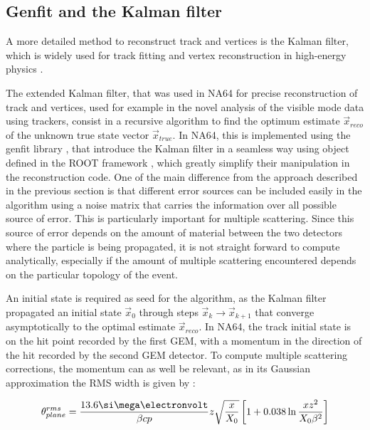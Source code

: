 \subsection{Genfit and the Kalman filter}
\label{appD:sec:kalman-filter}

A more detailed method to reconstruct track and vertices is the Kalman filter, which is widely used for track fitting and vertex reconstruction in high-energy physics \cite{HOPPNER2010518}.

The extended Kalman filter, that was used in NA64 for precise reconstruction of track and vertices, used for example in the novel analysis of the visible mode data using trackers, consist in a recursive algorithm to find the optimum estimate $\vec{x}_{reco}$ of the unknown true state vector $\vec{x}_{true}$. In NA64, this is implemented using the genfit library \cite{genfit}, that introduce the Kalman filter in a seamless way using object defined in the ROOT framework \cite{root}, which greatly simplify their manipulation in the reconstruction code. One of the main difference from the approach described in the previous section is that different error sources can be included easily in the algorithm using a noise matrix that carries the information over all possible source of error. This is particularly important for multiple scattering. Since this source of error depends on the amount of material between the two detectors where the particle is being propagated, it is not straight forward to compute analytically, especially if the amount of multiple scattering encountered depends on the particular topology of the event.

An initial state is required as seed for the algorithm, as the Kalman filter propagated an initial state $\vec{x}_0$ through steps $\vec{x}_k \rightarrow \vec{x}_{k+1}$ that converge asymptotically to the optimal estimate $\vec{x}_{reco}$. In NA64, the track initial state is on the hit point recorded by the first GEM, with a momentum in the direction of the hit recorded by the second GEM detector. To compute multiple scattering corrections, the momentum can as well be relevant, as in its Gaussian approximation the RMS width is given by \cite{review-particle-physics}:

\begin{equation}
  \label{eq:mm-scattering}
  \theta_{plane}^{rms} = \frac{13.6 \mev}{\beta c p} z \sqrt{\frac{x}{X_0}} \left[ 1 + 0.038 \ln{\frac{x z^2}{X_0 \beta^2}} \right]
\end{equation}


